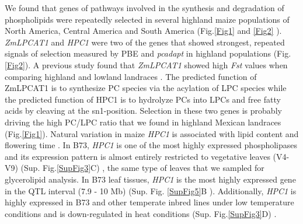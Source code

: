 \documentclass[9pt,twocolumn,twoside,lineno]{BioRxiv}
\begin{document}
We found that genes of pathways involved in the synthesis and degradation of phospholipids were repeatedly selected in several highland maize populations of North America, Central America and South America (Fig.\ref{Fig1} and \ref{Fig2} ). 
\textit{ZmLPCAT1} and \textit{HPC1} were two of the genes that showed strongest, repeated signals of selection measured by PBE and \textit{pcadapt} in highland populations (Fig. \ref{Fig2}). 
A previous study found that \textit{ZmLPCAT1} showed high \textit{Fst} values when comparing highland and lowland landraces \cite{Takuno2015-uj}.
The predicted function of ZmLPCAT1 is to synthesize PC species via the acylation of LPC species while the predicted function of HPC1 is to hydrolyze PCs into LPCs and free fatty acids by cleaving at the sn1-position.
Selection in these two genes is probably driving the high PC/LPC ratio that we found in highland Mexican landraces (Fig.\ref{Fig1}).
Natural variation in maize \textit{HPC1} is associated with lipid content \cite{Riedelsheimer2012-bx} and flowering time \cite{Chen2012-gg, Hung2012-ms}. 
In B73, \textit{HPC1} is one of the most highly expressed phospholipases and its expression pattern is almost entirely restricted to vegetative leaves (V4-V9) (Sup. Fig.\ref{SupFig3}C) \cite{Stelpflug2016-vr}, the same type of leaves that we sampled for glycerolipid analysis. 
In B73 leaf tissues, \textit{HPC1} is the most highly expressed gene in  the QTL interval (7.9 - 10 Mb) (Sup. Fig. \ref{SupFig5}B \cite{Stelpflug2016-vr}).
Additionally, \textit{HPC1} is highly expressed in B73 and other temperate inbred lines under low temperature conditions and is down-regulated in heat conditions (Sup. Fig.\ref{SupFig3}D) \cite{Waters2017-nat}.
\end{document}
